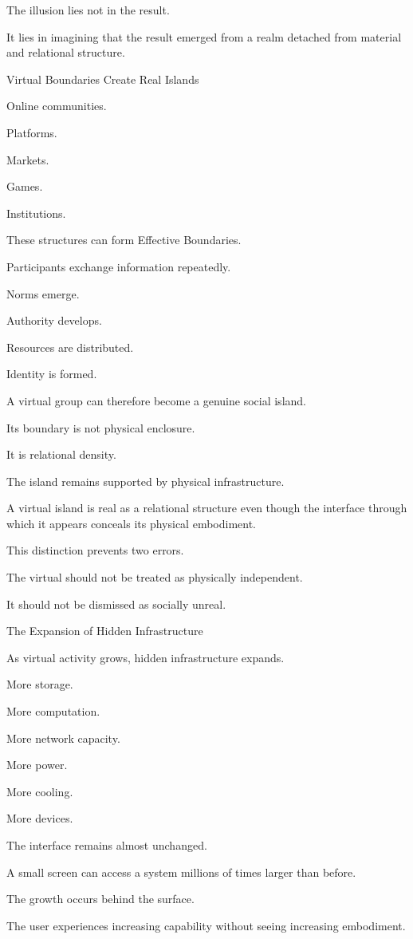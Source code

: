 The illusion lies not in the result.

It lies in imagining that the result emerged from a realm detached from material and relational structure.

Virtual Boundaries Create Real Islands

Online communities.

Platforms.

Markets.

Games.

Institutions.

These structures can form Effective Boundaries.

Participants exchange information repeatedly.

Norms emerge.

Authority develops.

Resources are distributed.

Identity is formed.

A virtual group can therefore become a genuine social island.

Its boundary is not physical enclosure.

It is relational density.

The island remains supported by physical infrastructure.

A virtual island is real as a relational structure even though the interface through which it appears conceals its physical embodiment.

This distinction prevents two errors.

The virtual should not be treated as physically independent.

It should not be dismissed as socially unreal.

The Expansion of Hidden Infrastructure

As virtual activity grows, hidden infrastructure expands.

More storage.

More computation.

More network capacity.

More power.

More cooling.

More devices.

The interface remains almost unchanged.

A small screen can access a system millions of times larger than before.

The growth occurs behind the surface.

The user experiences increasing capability without seeing increasing embodiment.

